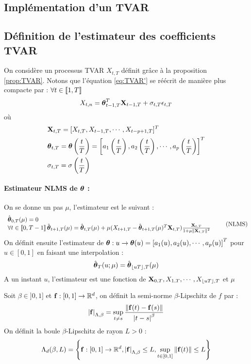 \documentclass[a4paper,french]{article}
\begin{document}
\subsection{Implémentation d'un TVAR}

\subsection{Définition de l'estimateur des coefficients TVAR}
On considère un processus TVAR $X_{t,T}$ définit grâce à la proposition \ref{prop:TVAR}. Notons que l'équation \eqref{eq:TVAR'} se réécrit de manière plus compacte par : $\forall t \in { \left\llbracket 1,T \right\rrbracket}$
$$
X_{t,n} = \boldsymbol{\theta}_{t-1,T}^T \mathbf{X}_{t-1,T} + \sigma_{t,T} \epsilon_{t,T}
$$
où 
\begin{align*}
&\mathbf{X}_{t,T} = [X_{t,T}, X_{t-1,T}, \cdots , X_{t-p+1,T} ]^T \\
&\boldsymbol{\theta}_{t,T} = \boldsymbol{\theta}\left(\frac{t}{T}\right) = \left[ a_1\left(\frac{t}{T}\right), a_2\left(\frac{t}{T}\right), \cdots, a_p\left(\frac{t}{T}\right) \right]^T \\
&\sigma_{t,T} = \sigma\left(\frac{t}{T}\right)
\end{align*}
\paragraph{Estimateur NLMS de $\boldsymbol{\theta}$ :}
On se donne un pas $\mu$, l'estimateur est le suivant :
\begin{equation}\label{eq:NLSM}
\begin{array}{l}
\hat{\boldsymbol{\theta}}_{0,T}(\mu) = 0 \\
\forall t \in { \left\llbracket 0,T-1 \right\rrbracket} \, \hat{\boldsymbol{\theta}}_{t+1,T}(\mu) = \hat{\boldsymbol{\theta}}_{t,T}(\mu) + \mu ( X_{t+1,T} - \hat{\boldsymbol{\theta}}_{t+1,T}(\mu)^T \mathbf{X}_{t,T} ) \frac{\mathbf{X}_{t,T}}{1+\mu { \left\| \mathbf{X}_{t,T} \right\|}^2}
\end{array}
\tag{NLMS}
\end{equation}
On définit ensuite l'estimateur de $\boldsymbol{\theta} : u \rightarrow \boldsymbol{\theta}(u) = \left[ a_1(u), a_2(u), \cdots, a_p(u) \right]^T$ pour $u\in [0,1]$ en faisant une interpolation :
$$
\hat{\boldsymbol{\theta}}_T(u ; \mu) = \hat{\boldsymbol{\theta}}_{{ \left\lfloor uT \right\rfloor },T}(\mu)
$$
A un instant $u$, l'estimateur est une fonction de $\mathbf{X}_{0,T}, X_{1,T}, \cdots , X_{{ \left\lfloor uT \right\rfloor },T}$ et $\mu$

\begin{Def}
Soit $\beta \in ]0,1]$ et $\mathbf{f} : [0,1] \to \mathbb{R}^d$, on définit la semi-norme $\beta$-Lipschitz de $f$ par :
$$
{ \left| \mathbf{f} \right|}_{\Lambda,\beta} = \sup_{t\neq s} \frac{{ \left\| \mathbf{f}(t)-\mathbf{f}(s) \right\|}}{{ \left| t-s \right|}^\beta}
$$
On définit la boule $\beta$-Lipschitz de rayon $L > 0$ : 
$$
\Lambda_d(\beta,L) = { \left\lbrace  \mathbf{f} : [0,1] \to \mathbb{R}^d, { \left| \mathbf{f} \right|}_{\Lambda,\beta} \leq L, \sup_{t\in [0,1]} { \left\| \mathbf{f}(t) \right\|} \leq L  \right\rbrace }
$$
\end{Def}
\end{document}
